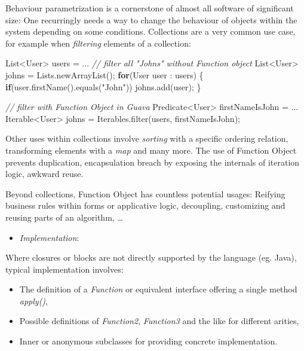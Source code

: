 \documentclass[11pt,]{article}
\newenvironment{Shaded}{}{}
\newcommand{\KeywordTok}[1]{\textcolor[rgb]{0.00,0.44,0.13}{\textbf{{#1}}}}
\newcommand{\StringTok}[1]{\textcolor[rgb]{0.25,0.44,0.63}{{#1}}}
\newcommand{\CommentTok}[1]{\textcolor[rgb]{0.38,0.63,0.69}{\textit{{#1}}}}
\newcommand{\FunctionTok}[1]{\textcolor[rgb]{0.02,0.16,0.49}{{#1}}}
\newcommand{\NormalTok}[1]{{#1}}
\begin{document}
Behaviour parametrization is a cornerstone of almost all software of
significant size: One recurringly needs a way to change the behaviour of
objects within the system depending on some conditions. Collections are
a very common use case, for example when \emph{filtering} elements of a
collection:

\begin{Shaded}
\begin{Highlighting}[]
\NormalTok{List<User> users = ...}
\CommentTok{// filter all "Johns" without Function object}
\NormalTok{List<User> johns = Lists.}\FunctionTok{newArrayList}\NormalTok{();}
\KeywordTok{for}\NormalTok{(User user : users) \{ }
  \KeywordTok{if}\NormalTok{(user.}\FunctionTok{firstName}\NormalTok{().}\FunctionTok{equals}\NormalTok{(}\StringTok{"John"}\NormalTok{)) johns.}\FunctionTok{add}\NormalTok{(user);}
\NormalTok{\}}

\CommentTok{// filter with Function Object in Guava}
\NormalTok{Predicate<User> firstNameIsJohn = ...}
\NormalTok{Iterable<User> johns = Iterables.}\FunctionTok{filter}\NormalTok{(users, firstNameIsJohn);}
\end{Highlighting}
\end{Shaded}

Other uses within collections involve \emph{sorting} with a specific
ordering relation, transforming elements with a \emph{map} and many
more. The use of Function Object prevents duplication, encapsulation
breach by exposing the internals of iteration logic, awkward reuse.

Beyond collections, Function Object has countless potential usages:
Reifying business rules within forms or applicative logic, decoupling,
customizing and reusing parts of an algorithm, \ldots{}

\begin{itemize}
\item
  \emph{Implementation}:
\end{itemize}

Where closures or blocks are not directly supported by the language (eg.
Java), typical implementation involves:

\begin{itemize}
\item
  The definition of a \emph{Function} or equivalent interface offering a
  single method \emph{apply()},
\item
  Possible definitions of \emph{Function2}, \emph{Function3} and the
  like for different arities,
\item
  Inner or anonymous subclasses for providing concrete implementation.
\end{itemize}
\end{document}
